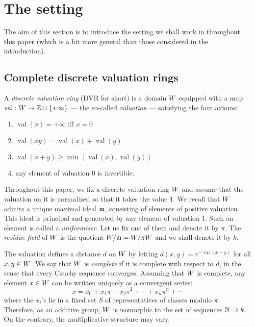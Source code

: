 \documentclass{article}
\DeclareMathOperator{\val}{val}
\begin{document}
\section{The setting}
\label{subsec:setting}

The aim of this section is to introduce the setting we shall work in 
throughout this paper (which is a bit more general than those considered 
in the introduction).

\subsection{Complete discrete valuation rings}

\begin{deftn}
A \emph{discrete valuation ring} (DVR for short) is a domain $W$
equipped with a map $\val : \A \to \Z \cup \{+\infty\}$ --- the 
so-called \emph{valuation} --- satisfying the four axioms: 
\begin{enumerate}
\item $\val(x) = +\infty$ iff $x = 0$
\item $\val(xy) = \val(x) + \val(y)$
\item $\val(x+y) \geq \min(\val(x), \val(y))$
\item any element of valuation $0$ is invertible.
\end{enumerate}
\end{deftn}

Throughout this paper, we fix a discrete valuation ring $W$ and assume 
that the valuation on it is normalized so that it takes the value $1$. 
We recall that $W$ admits a unique maximal ideal $\mathfrak m$, consisting of 
elements of positive valuation. This ideal is principal and 
generated by any element of valuation $1$. Such an element is called a 
\emph{uniformizer}. Let us fix one of them and denote it by $\pi$. The 
\emph{residue field} of $W$ is the quotient $W/\mathfrak m = W/\pi W$ and we 
shall denote it by $k$.

The valuation defines a distance $d$ on $W$ by letting $d(x,y) = 
e^{-\val(x-y)}$ for all $x, y \in W$. We say that $W$ is 
\emph{complete} if it is complete with respect to $d$, in the sense that 
every Cauchy sequence converges. Assuming that $W$ is complete, any 
element $x \in W$ can be written uniquely as a convergent series:
\begin{equation}
\label{eq:expandCDVR}
x = x_0 + x_1 \pi + x_2 \pi^2 + \cdots + x_n \pi^n + \cdots
\end{equation}
where the $x_i$'s lie in a fixed set $S$ of representatives of classes
modulo $\pi$. Therefore, as an additive group, $W$ is isomorphic to 
the set of sequences $\mathbb N \to k$. On the contrary, the multiplicative
structure may vary.
\end{document}
